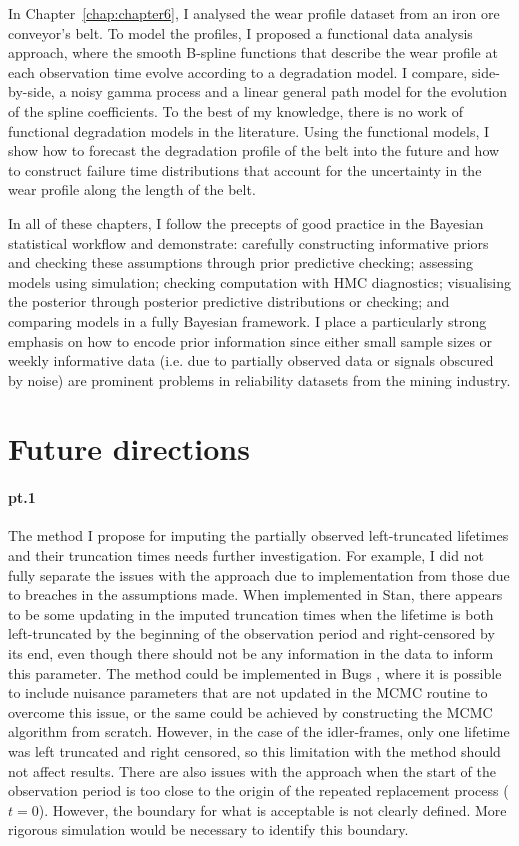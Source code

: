 In Chapter~\ref{chap:chapter6}, I analysed the wear profile dataset from an iron ore conveyor's belt. To model the profiles, I proposed a functional data analysis approach, where the smooth B-spline functions that describe the wear profile at each observation time evolve according to a degradation model. I compare, side-by-side, a noisy gamma process and a linear general path model for the evolution of the spline coefficients. To the best of my knowledge, there is no work of functional degradation models in the literature. Using the functional models, I show how to forecast the degradation profile of the belt into the future and how to construct failure time distributions that account for the uncertainty in the wear profile along the length of the belt.

In all of these chapters, I follow the precepts of good practice in the Bayesian statistical workflow and demonstrate: carefully constructing informative priors and checking these assumptions through prior predictive checking; assessing models using simulation; checking computation with HMC diagnostics; visualising the posterior through posterior predictive distributions or checking; and comparing models in a fully Bayesian framework. I place a particularly strong emphasis on how to encode prior information since either small sample sizes or weekly informative data (i.e. due to partially observed data or signals obscured by noise) are prominent problems in reliability datasets from the mining industry.

\section{Future directions} \label{sec:thesis-future-work}

\paragraph*{pt.1} The method I propose for imputing the partially observed left-truncated lifetimes and their truncation times needs further investigation. For example, I did not fully separate the issues with the approach due to implementation from those due to breaches in the assumptions made. When implemented in Stan, there appears to be some updating in the imputed truncation times when the lifetime is both left-truncated by the beginning of the observation period and right-censored by its end, even though there should not be any information in the data to inform this parameter. The method could be implemented in Bugs \citep{lunn2012}, where it is possible to include nuisance parameters that are not updated in the MCMC routine to overcome this issue, or the same could be achieved by constructing the MCMC algorithm from scratch. However, in the case of the idler-frames, only one lifetime was left truncated and right censored, so this limitation with the method should not affect results. There are also issues with the approach when the start of the observation period is too close to the origin of the repeated replacement process ($t = 0$). However, the boundary for what is acceptable is not clearly defined. More rigorous simulation would be necessary to identify this boundary.

